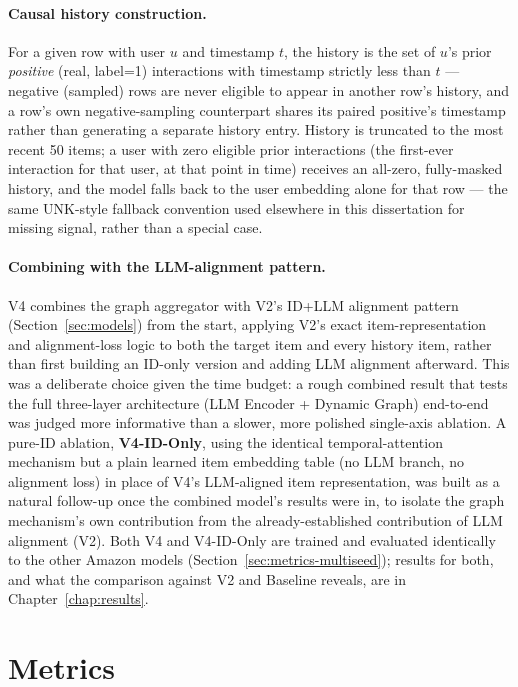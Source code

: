\documentclass{uclthesis}
\begin{document}
\paragraph{Causal history construction.} For a given row with user $u$ and timestamp $t$, the history is the set of $u$'s prior \emph{positive} (real, label=1) interactions with timestamp strictly less than $t$ --- negative (sampled) rows are never eligible to appear in another row's history, and a row's own negative-sampling counterpart shares its paired positive's timestamp rather than generating a separate history entry. History is truncated to the most recent 50 items; a user with zero eligible prior interactions (the first-ever interaction for that user, at that point in time) receives an all-zero, fully-masked history, and the model falls back to the user embedding alone for that row --- the same UNK-style fallback convention used elsewhere in this dissertation for missing signal, rather than a special case.

\paragraph{Combining with the LLM-alignment pattern.} V4 combines the graph aggregator with V2's ID+LLM alignment pattern (Section~\ref{sec:models}) from the start, applying V2's exact item-representation and alignment-loss logic to both the target item and every history item, rather than first building an ID-only version and adding LLM alignment afterward. This was a deliberate choice given the time budget: a rough combined result that tests the full three-layer architecture (LLM Encoder + Dynamic Graph) end-to-end was judged more informative than a slower, more polished single-axis ablation. A pure-ID ablation, \textbf{V4-ID-Only}, using the identical temporal-attention mechanism but a plain learned item embedding table (no LLM branch, no alignment loss) in place of V4's LLM-aligned item representation, was built as a natural follow-up once the combined model's results were in, to isolate the graph mechanism's own contribution from the already-established contribution of LLM alignment (V2). Both V4 and V4-ID-Only are trained and evaluated identically to the other Amazon models (Section~\ref{sec:metrics-multiseed}); results for both, and what the comparison against V2 and Baseline reveals, are in Chapter~\ref{chap:results}.

\section{Metrics}
\label{sec:metrics}
\end{document}
